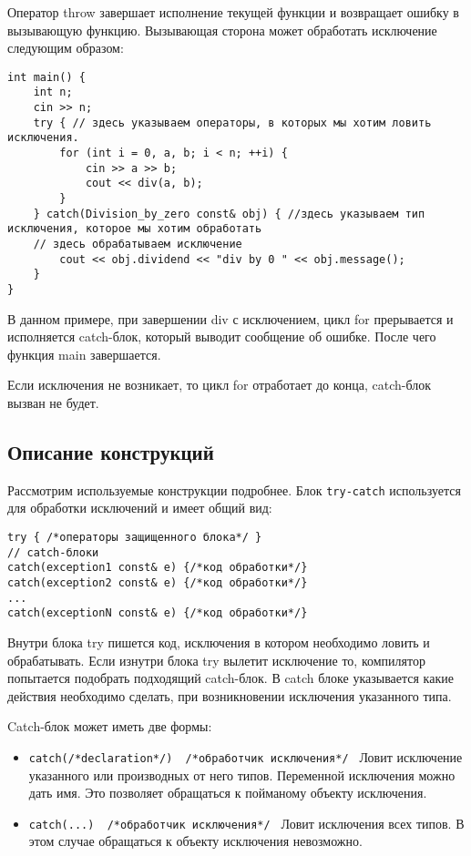 Оператор throw завершает исполнение текущей функции и возвращает ошибку в вызывающую функцию. Вызывающая сторона может обработать исключение следующим образом:

\begin{verbatim}
int main() {
    int n;
    cin >> n;
    try { // здесь указываем операторы, в которых мы хотим ловить исключения.
        for (int i = 0, a, b; i < n; ++i) {
            cin >> a >> b;
            cout << div(a, b);
        }
    } catch(Division_by_zero const& obj) { //здесь указываем тип исключения, которое мы хотим обработать
    // здесь обрабатываем исключение
        cout << obj.dividend << "div by 0 " << obj.message();
    }
}
\end{verbatim}

В данном примере, при завершении div с исключением, цикл for прерывается и исполняется catch-блок, который выводит сообщение об ошибке. После чего функция main завершается.

Если исключения не возникает, то цикл for отработает до конца, catch-блок вызван не будет.

\subsection{Описание конструкций}
Рассмотрим используемые конструкции подробнее. Блок \texttt{try-catch} используется для обработки исключений и имеет общий вид:
\begin{verbatim}
try { /*операторы защищенного блока*/ }
// catch-блоки
catch(exception1 const& e) {/*код обработки*/}
catch(exception2 const& e) {/*код обработки*/}
...
catch(exceptionN const& e) {/*код обработки*/}

\end{verbatim}
Внутри блока try пишется код, исключения в котором необходимо ловить и обрабатывать. Если изнутри блока try вылетит исключение то, компилятор попытается подобрать подходящий catch-блок. В catch блоке указывается какие действия необходимо сделать, при возникновении исключения указанного типа.

Catch-блок может иметь две формы:
\begin{itemize}
    \item
    \texttt{catch(/*declaration*/) { /*обработчик исключения*/ }} Ловит исключение указанного или производных от него типов. Переменной исключения можно дать имя. Это позволяет обращаться к пойманому объекту исключения.
    \item
    \texttt{catch(...) { /*обработчик исключения*/ }}
    Ловит исключения всех типов. В этом случае обращаться к объекту исключения невозможно.
\end{itemize}


